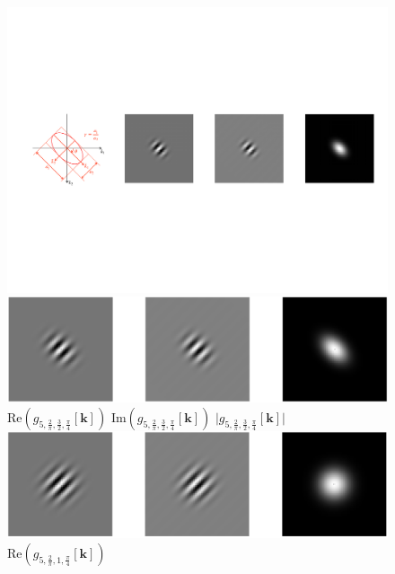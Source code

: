 \documentclass[fleqn,a4paper,oneside,openany]{book}
\begin{document}
%
\begin{figure}
\centering
\includegraphics[trim = 0 0 0 0, clip, scale=0.8]{GaborCoords.pdf}\\
\vspace{.3cm}
\includegraphics[trim = 0 0 0 0, clip, scale=0.77]{Gabor.png}\\
$\text{Re}\left(g_{5,\frac{2}{\pi},\frac{3}{2},\frac{\pi}{4}}[\boldsymbol{k}]\right)$
\hspace{1.6cm}
$\text{Im}\left(g_{5,\frac{2}{\pi},\frac{3}{2},\frac{\pi}{4}}[\boldsymbol{k}]\right)$
\hspace{1.8cm}
$\lvert g_{5,\frac{2}{\pi},\frac{3}{2},\frac{\pi}{4}}[\boldsymbol{k}]\rvert$
%
\includegraphics[trim = 0 0 0 0, clip, scale=0.77]{Gabor2.png}\\
$\text{Re}\left(g_{5,\frac{2}{\pi},1,\frac{\pi}{4}}[\boldsymbol{k}]\right)$

\end{figure}
\end{document}
